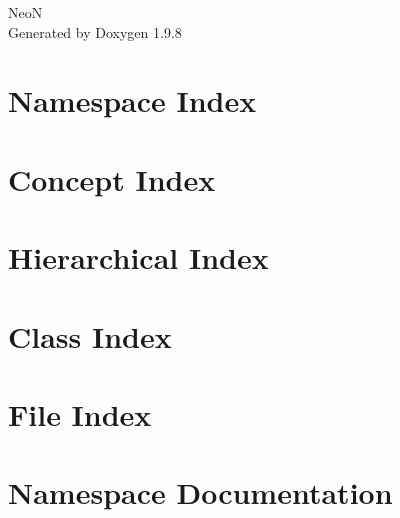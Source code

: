 \documentclass[twoside]{book}
\newcommand{\+}{\discretionary{\mbox{\scriptsize$\hookleftarrow$}}{}{}}
\newcommand{\clearemptydoublepage}{%
    \newpage{\pagestyle{empty}\cleardoublepage}%
  }
\begin{document}
  \raggedbottom
    \hypersetup{pageanchor=false,
                bookmarksnumbered=true,
                pdfencoding=unicode
               }
  \begin{titlepage}
  \vspace*{7cm}
  \begin{center}%
  {\Large NeoN}\\
  \vspace*{1cm}
  {\large Generated by Doxygen 1.9.8}\\
  \end{center}
  \end{titlepage}
  \clearemptydoublepage
  \tableofcontents
  \clearemptydoublepage
  \hypersetup{pageanchor=true}
\chapter{Namespace Index}

\chapter{Concept Index}

\chapter{Hierarchical Index}

\chapter{Class Index}

\chapter{File Index}

\chapter{Namespace Documentation}

















\end{document}
